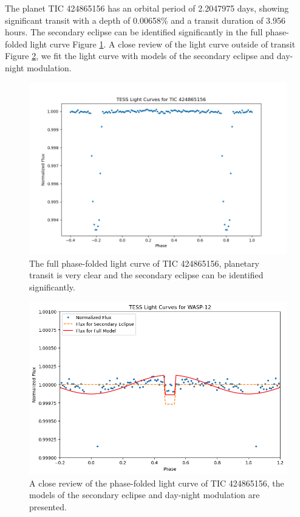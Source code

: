 \documentclass{article}
\begin{document}
The planet TIC 424865156 has an orbital period of 2.2047975 days, showing significant transit with a depth of 0.00658\% and a transit duration of 3.956 hours. The secondary eclipse can be identified significantly in the full phase-folded light curve Figure \ref{fig:424865156_folded}. A close review of the light curve outside of transit Figure \ref{fig:424865156}, we fit the light curve with models of the secondary eclipse and day-night modulation.\begin{figure}[H]\centering\includegraphics[width=0.7\linewidth]{image/424865156_folded.png}\captionsetup{font=small} \caption{The full phase-folded light curve of TIC 424865156, planetary transit is very clear and the secondary eclipse can be identified significantly.}\label{fig:424865156_folded}\end{figure}\begin{figure}[H]\centering\includegraphics[width=0.65\linewidth]{image/424865156.png}\captionsetup{font=small} \caption{A close review of the phase-folded light curve of TIC 424865156, the models of the secondary eclipse and day-night modulation are presented.}\label{fig:424865156}\end{figure}
\newpage
\end{document}
